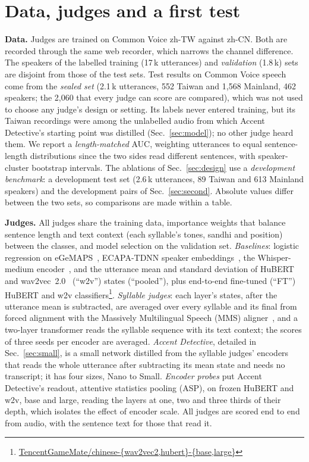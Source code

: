 \documentclass{Interspeech}
\begin{document}
\section{Data, judges and a first test}
\label{sec:first}

\textbf{Data.} Judges are trained on Common Voice zh-TW against zh-CN. Both are recorded through the same web recorder, which narrows the channel difference. The speakers of the labelled training (17\,k utterances) and \emph{validation} (1.8\,k) sets are disjoint from those of the test sets. Test results on Common Voice speech come from the \emph{sealed set} (2.1\,k utterances, 552 Taiwan and 1,568 Mainland, 462 speakers; the 2,060 that every judge can score are compared), which was not used to choose any judge's design or setting. Its labels never entered training, but its Taiwan recordings were among the unlabelled audio from which Accent Detective's starting point was distilled (Sec.~\ref{sec:model}); no other judge heard them. We report a \emph{length-matched} AUC, weighting utterances to equal sentence-length distributions since the two sides read different sentences, with speaker-cluster bootstrap intervals. The ablations of Sec.~\ref{sec:design} use a \emph{development benchmark}: a development test set (2.6\,k utterances, 89 Taiwan and 613 Mainland speakers) and the development pairs of Sec.~\ref{sec:second}. Absolute values differ between the two sets, so comparisons are made within a table.

\textbf{Judges.} All judges share the training data, importance weights that balance sentence length and text context (each syllable's tones, sandhi and position) between the classes, and model selection on the validation set. \emph{Baselines}: logistic regression on eGeMAPS~\cite{eyben2016gemaps}, ECAPA-TDNN speaker embeddings~\cite{desplanques2020ecapa}, the Whisper-medium encoder~\cite{radford2023whisper}, and the utterance mean and standard deviation of HuBERT~\cite{hsu2021hubert} and wav2vec~2.0~\cite{baevski2020wav2vec} (``w2v'') states (``pooled''), plus end-to-end fine-tuned (``FT'') HuBERT and w2v classifiers\footnote{\url{TencentGameMate/chinese-{wav2vec2,hubert}-{base,large}}}. \emph{Syllable judges}: each layer's states, after the utterance mean is subtracted, are averaged over every syllable and its final from forced alignment with the Massively Multilingual Speech (MMS) aligner~\cite{pratap2024mms}, and a two-layer transformer reads the syllable sequence with its text context; the scores of three seeds per encoder are averaged. \emph{Accent Detective}, detailed in Sec.~\ref{sec:small}, is a small network distilled from the syllable judges' encoders that reads the whole utterance after subtracting its mean state and needs no transcript; it has four sizes, Nano to Small. \emph{Encoder probes} put Accent Detective's readout, attentive statistics pooling (ASP), on frozen HuBERT and w2v, base and large, reading the layers at one, two and three thirds of their depth, which isolates the effect of encoder scale. All judges are scored end to end from audio, with the sentence text for those that read it.
\end{document}
